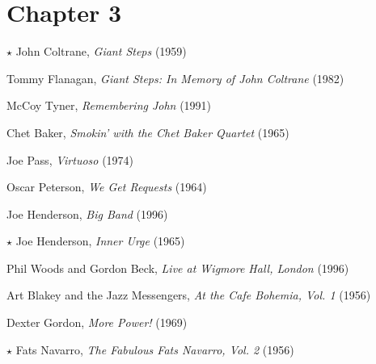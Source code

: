 \section*{Chapter 3}

\begin{compactitem}
    \item[$\star$] John Coltrane, \emph{Giant Steps} (1959)
    \item Tommy Flanagan, \emph{Giant Steps: In Memory of John Coltrane} (1982)
    \item McCoy Tyner, \emph{Remembering John} (1991)
\end{compactitem}
\nocite{coltrane:giantsteps,flanagan:giantsteps,tyner:remembering}

\begin{compactitem}
    \item Chet Baker, \emph{Smokin' with the Chet Baker Quartet} (1965)
    \item Joe Pass, \emph{Virtuoso} (1974)
    \item Oscar Peterson, \emph{We Get Requests} (1964)
\end{compactitem}
\nocite{baker:smokin,pass:virtuoso,peterson:requests}


\begin{compactitem}
    \item Joe Henderson, \emph{Big Band} (1996)
    \item[$\star$] Joe Henderson, \emph{Inner Urge} (1965)
    \item Phil Woods and Gordon Beck, \emph{Live at Wigmore Hall, London} (1996)
\end{compactitem}
\nocite{henderson:bigband,henderson:isotope,woods:wigmore}

\begin{compactitem}
    \item Art Blakey and the Jazz Messengers, \emph{At the Cafe Bohemia,
        Vol. 1} (1956)
    \item Dexter Gordon, \emph{More Power!} (1969)
    \item[$\star$] Fats Navarro, \emph{The Fabulous Fats Navarro, Vol. 2} (1956)
\end{compactitem}
\nocite{blakey:bohemia,gordon:power,navarro:fabulous}

\clearpage


